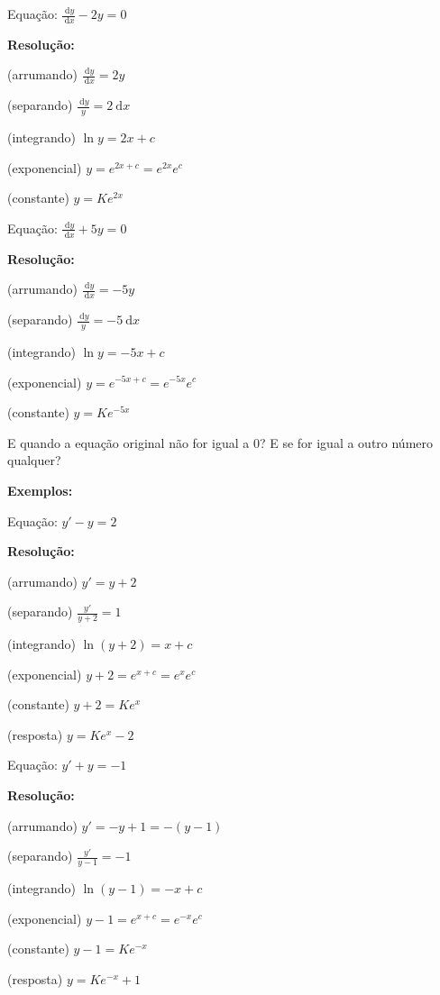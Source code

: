 \documentclass[a4paper]{article}
\newcommand{\ud}{\mathrm{\ d}}
\begin{document}
\begin{multicols}{2}

Equação: $\frac{\ud y}{\ud x} - 2y =0$

{\bf Resolução:}

(arrumando) $\frac{\ud y}{\ud x} = 2y$

(separando) $\frac{\ud y}{y} = 2\ud x$

(integrando) $\ln y = 2x +c$

(exponencial) $y = e^{2x+c}=e^{2x}e^c$

(constante) $y=Ke^{2x}$
\columnbreak

Equação: $\frac{\ud y}{\ud x}  +5y =0$

{\bf Resolução:}

(arrumando) $\frac{\ud y}{\ud x} = -5y$

(separando) $\frac{\ud y}{y} = -5\ud x$

(integrando) $\ln y = -5x +c$

(exponencial) $y = e^{-5x+c}=e^{-5x}e^c$

(constante) $y=Ke^{-5x}$

\end{multicols}

E quando a equação original não for igual a 0? E se for igual a outro
número qualquer?

{\bf Exemplos:}

\begin{multicols}{2}

Equação: $y' - y =2$

{\bf Resolução:}

(arrumando) $y' = y + 2$

(separando) $\frac{y'}{y+2} = 1$

\smallskip

(integrando) $\ln (y+2) = x+c$

(exponencial) $y+2 = e^{x+c}=e^{x}e^c$

(constante) $y+2=Ke^{x}$

(resposta) $y=Ke^{x}-2$

\columnbreak

Equação: $y' + y =-1$

{\bf Resolução:}

(arrumando) $y' = - y+1 = -(y-1)$

(separando) $\frac{y'}{y-1} = -1$

\smallskip

(integrando) $\ln (y-1) = -x+c$

(exponencial) $y-1 = e^{x+c}=e^{-x}e^c$

(constante) $y-1=Ke^{-x}$

(resposta) $y=Ke^{-x}+1$

\end{multicols}
\end{document}
